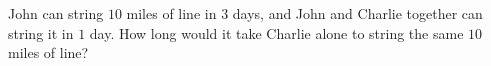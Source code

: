 John can string $10$ miles of line in $3$ days, and John and Charlie together can string it in $1$ day. How long would it take Charlie alone to string the same $10$ miles of line?
